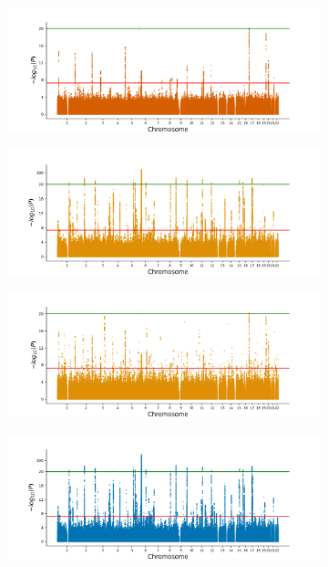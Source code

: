 \begin{figure}[h!]
\begin{subfigure}{.5\textwidth}
    \includegraphics[width=\textwidth]{figures/manhattan_bin/regenie_400kBasal_cell_carcinoma.png}
    \end{subfigure}
    \begin{subfigure}{.5\textwidth}
    \includegraphics[width=\textwidth]{figures/manhattan_bin/imputed_bgen_bolt_0.sumstats.gz.png}
    \end{subfigure}%
    \begin{subfigure}{.5\textwidth}
    \includegraphics[width=\textwidth]{figures/manhattan_bin/imputed_bgen_bolt_1.sumstats.gz.png}
    \end{subfigure}
    \begin{subfigure}{.5\textwidth}
    \includegraphics[width=\textwidth]{figures/manhattan_bin/qd_Asthma.sumstats.gz.png}

\end{subfigure}
\end{figure}
